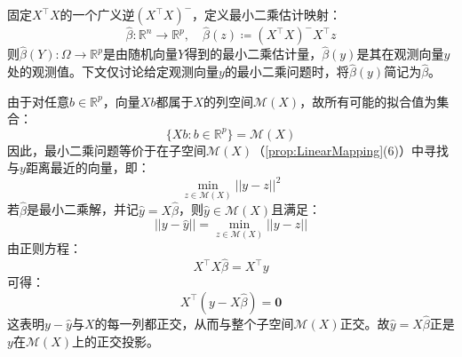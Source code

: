 \begin{definition}
	固定$X^{\top}X$的一个广义逆$(X^{\top}X)^-$，定义最小二乘估计映射：
	\begin{equation*}
		\hat{\beta}:\mathbb{R}^n\to\mathbb{R}^p,\quad
		\hat{\beta}(z)\coloneq(X^{\top}X)^-X^{\top}z
	\end{equation*}
	则$\hat{\beta}(Y):\Omega\to\mathbb{R}^p$是由随机向量$Y$得到的最小二乘估计量，$\hat{\beta}(y)$是其在观测向量$y$处的观测值。下文仅讨论给定观测向量$y$的最小二乘问题时，将$\hat{\beta}(y)$简记为$\hat{\beta}$。
\end{definition}
\begin{derivation}
	由于对任意$b\in\mathbb{R}^p$，向量$Xb$都属于$X$的列空间$\mathcal{M}(X)$，故所有可能的拟合值为集合：
	\begin{equation*}
		\{Xb:b\in\mathbb{R}^p\}=\mathcal{M}(X)
	\end{equation*}
	因此，最小二乘问题等价于在子空间$\mathcal{M}(X)$（\cref{prop:LinearMapping}(6)）中寻找与$y$距离最近的向量，即：
	\begin{equation*}
		\min_{z\in\mathcal{M}(X)}||y-z||^2
	\end{equation*}
	若$\hat{\beta}$是最小二乘解，并记$\hat{y}=X\hat{\beta}$，则$\hat{y}\in\mathcal{M}(X)$且满足：
	\begin{equation*}
		||y-\hat{y}||=\min_{z\in\mathcal{M}(X)}||y-z||
	\end{equation*}
	由正则方程：
	\begin{equation*}
		X^{\top}X\hat{\beta}=X^{\top}y
	\end{equation*}
	可得：
	\begin{equation*}
		X^{\top}(y-X\hat{\beta})=\mathbf{0}
	\end{equation*}
	这表明$y-\hat{y}$与$X$的每一列都正交，从而与整个子空间$\mathcal{M}(X)$正交。故$\hat{y}=X\hat{\beta}$正是$y$在$\mathcal{M}(X)$上的正交投影。
\end{derivation}
